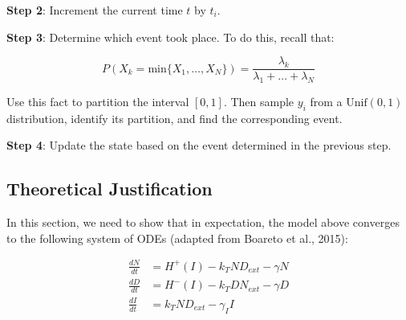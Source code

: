 \documentclass{article}
\begin{document}
\begin{flushleft}
\medskip

\textbf{Step 2}: Increment the current time $t$ by $t_{i}$.

\medskip

\textbf{Step 3}: Determine which event took place. To do this, recall that:

$$P(X_{k} = \text{min} \{  X_{1}, \dots, X_{N} \}) = \frac{\lambda_{k}}{\lambda_{1} + \dots + \lambda_{N}}$$

Use this fact to partition the interval $[0, 1]$. Then sample $y_{i}$ from a $\text{Unif}(0, 1)$ distribution, identify its partition, and find the corresponding event.

\medskip

\textbf{Step 4}: Update the state based on the event determined in the previous step.

\subsection{Theoretical Justification}

In this section, we need to show that in expectation, the model above converges to the following system of ODEs (adapted from Boareto et al., 2015):

$$
\begin{aligned}
  \frac{dN}{dt} &= H^{+}(I) - k_{T}ND_{ext} - \gamma N \\[5pt]
  \frac{dD}{dt} &= H^{-}(I) - k_{T}DN_{ext} - \gamma D \\[5pt]
  \frac{dI}{dt} &= k_{T}ND_{ext} - \gamma_{I}I
\end{aligned}
$$

\end{flushleft}
\end{document}
